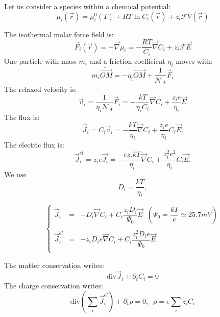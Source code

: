 \documentclass[aps,12pt]{revtex4}
\begin{document}
Let us consider a species within a chemical potential:
\begin{equation}
	\mu_i(\vec{r}) = \mu_i^0(T) + RT \ln C_i(\vec{r}) +  z_i \mathcal{F} V(\vec{r})
\end{equation}

The isothermal molar force field is:
\begin{equation}
	\vec{F}_i(\vec{r}) = -\vec{\nabla} \mu_{i} = -\frac{RT}{C_i} \vec{\nabla} C_i + z_i \mathcal{F} \vec{E}
\end{equation}
One particle with mass $m_i$ and a friction coefficient $\eta_i$ moves with:
\begin{equation}
	m_i  \ddot{\vec{OM}} = -\eta_i  \dot{\vec{OM}} + \dfrac{1}{\mathcal{N}_A} \vec{F}_i
\end{equation}
The relaxed velocity is:
\begin{equation}
	\vec{v}_i = \dfrac{1}{\eta_i\mathcal{N}_A} \vec{F}_i = -\dfrac{kT}{\eta_i C_i} \vec{\nabla} C_i + \frac{z_i e}{\eta_i} \vec{E}
\end{equation}
The flux is:
\begin{equation}
	\vec{J}_i = C_i \vec{v}_i = -\dfrac{kT}{\eta_i} \vec{\nabla} C_i + \dfrac{z_i e}{\eta_i} C_i \vec{E}.
\end{equation}
The electric flux is:
\begin{equation}
	\vec{J}^{el}_i = z_i e \vec{J_i} = -\dfrac{ez_ikT}{\eta_i} \vec{\nabla} C_i + \dfrac{z_i^2 e^2}{\eta_i} C_i \vec{E}.
\end{equation}
We use
\begin{equation}
	D_i = \dfrac{kT}{\eta_i}, 
\end{equation}

\begin{equation}
\left\lbrace
\begin{array}{rcl}
\vec{J}_i & = &  -D_i \vec{\nabla} C_i + C_i \dfrac{z_i D_i}{\Psi_0}  \vec{E} \;\; (\Psi_0=\dfrac{kT}{e}\simeq 25.7 mV)\\
\\
\vec{J}^{el}_i & = & - z_i D_i e  \vec{\nabla} C_i + C_i \dfrac{z_i^2 D_i e}{\Psi_0}  \vec{E} \\
\end{array}
\right.
\end{equation}


The matter conservation writes:
\begin{equation}
	\mathrm{div} \vec{J}_i + \partial_t C_i = 0
\end{equation}
The charge conservation writes:
\begin{equation}
	\mathrm{div} \left( \sum_i \vec{J}^{el}_i \right) + \partial_t \rho = 0, \;\; \rho = e \sum_i z_i C_i
\end{equation}
\end{document}
